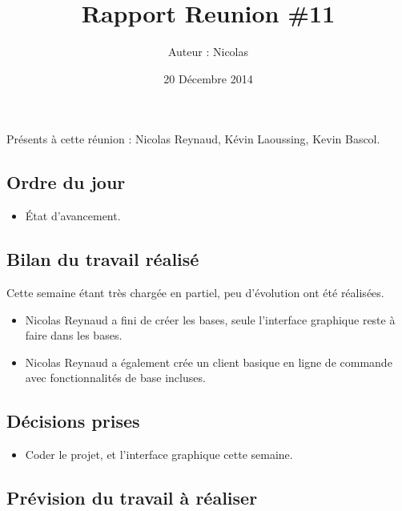 \documentclass[12pt,a4paper]{article}
\title{Rapport Reunion \#11}
\author{Auteur : Nicolas \bsc{REYNAUD}}
\date{20 Décembre 2014}
\begin{document}
\maketitle

\newpage

Présents à cette réunion : Nicolas Reynaud, Kévin Laoussing, Kevin Bascol.

\subsection*{Ordre du jour}
\begin{itemize}[label = $\circledcirc$]
	\item État d'avancement.
\end{itemize}

\subsection*{Bilan du travail réalisé}
Cette semaine étant très chargée en partiel, peu d'évolution ont été réalisées.

\begin{itemize}[label = $\circledcirc$]
	\item Nicolas Reynaud a fini de créer les bases, seule l'interface graphique reste à faire dans les bases.
	\item Nicolas Reynaud a également crée un client basique en ligne de commande avec fonctionnalités de base incluses.
\end{itemize}


\subsection*{Décisions prises}

\begin{itemize}[label = $\circledcirc$]
	\item Coder le projet, et l'interface graphique cette semaine.
\end{itemize}

\subsection*{Prévision du travail à réaliser}
\end{document}

